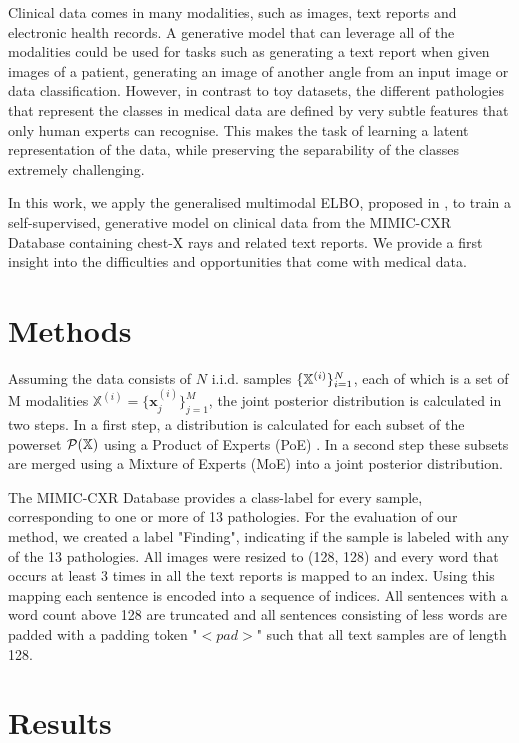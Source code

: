 \documentclass{midl} %
\begin{document}
	Clinical data comes in many modalities, such as images, text reports and electronic health records.
	A generative model that can leverage all of the modalities could be used for tasks such as generating a text report when given images of a patient, generating an image of another angle from an input image or data classification.
	However, in contrast to toy datasets, the different pathologies that represent the classes in medical data are defined by very subtle features that only human experts can recognise.
	This makes the task of learning a latent representation of the data, while preserving the separability of the classes extremely challenging.
	
	In this work, we apply the generalised multimodal ELBO, proposed in \cite{thomas_gener-ELBO}, to train a self-supervised, generative model on clinical data from the MIMIC-CXR Database \cite{johnson2019mimic} containing chest-X rays and related text reports. 
	We provide a first insight into the difficulties and opportunities that come with medical data.

\section{Methods}
Assuming the data consists of $N$ i.i.d. samples $\{\mathbb{X}^{(i)}\}^N_{i=1}$, each of which is a set of M modalities $\mathbb{X}^{(i)} = \{\textbf{x}_j^{(i)}\}^M_{j=1}$, the joint posterior distribution is calculated in two steps.
In a first step, a distribution is calculated for each subset of the powerset $\mathcal{P}(\mathbb{X})$ using a Product of Experts (PoE) \cite{wu2018multimodal}.
In a second step these subsets are merged using a Mixture of Experts (MoE) \cite{shi2019variational} into a joint posterior distribution.

The MIMIC-CXR Database \cite{johnson2019mimic} provides a class-label for every sample, corresponding to one or more of 13 pathologies.
For the evaluation of our method, we created a label "Finding", indicating if the sample is labeled with any of the 13 pathologies. 
All images were resized to (128, 128) and every word that occurs at
least 3 times in all the text reports is mapped to an index. 
Using this mapping each sentence is encoded into a sequence of indices. 
All sentences with a word count above 128 are truncated and all sentences consisting of less words are padded with a padding token "$< pad>$" such that all text samples are of length 128.

\section{Results}
\end{document}
